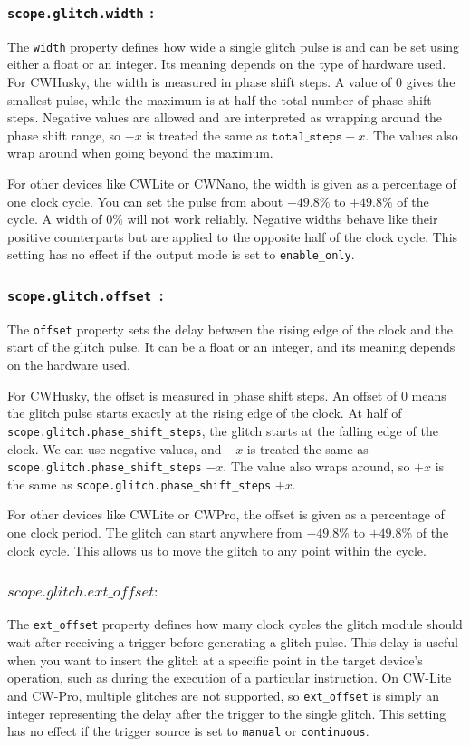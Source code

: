\subsubsection{\textbf{\texttt{scope.glitch.width} :}} 
The \texttt{width} property defines how wide a single glitch pulse is and can be set using either a float or an integer. Its meaning depends on the type of hardware used. For CWHusky, the width is measured in phase shift steps. A value of 0 gives the smallest pulse, while the maximum is at half the total number of phase shift steps. Negative values are allowed and are interpreted as wrapping around the phase shift range, so $-x$ is treated the same as $\texttt{total\_steps} - x$. The values also wrap around when going beyond the maximum.

For other devices like CWLite or CWNano, the width is given as a percentage of one clock cycle. You can set the pulse from about $-49.8\%$ to $+49.8\%$ of the cycle. A width of $0\%$ will not work reliably. Negative widths behave like their positive counterparts but are applied to the opposite half of the clock cycle. This setting has no effect if the output mode is set to \texttt{enable\_only}.

\subsubsection{\textbf{\texttt{scope.glitch.offset }:}}
The \texttt{offset} property sets the delay between the rising edge of the clock and the start of the glitch pulse. It can be a float or an integer, and its meaning depends on the hardware used.

For CWHusky, the offset is measured in phase shift steps. An offset of 0 means the glitch pulse starts exactly at the rising edge of the clock. At half of \texttt{scope.glitch.phase\_shift\_steps}, the glitch starts at the falling edge of the clock. We can use negative values, and $-x$ is treated the same as \texttt{scope.glitch.phase\_shift\_steps} $- x$. The value also wraps around, so $+x$ is the same as \texttt{scope.glitch.phase\_shift\_steps} $+ x$. 

For other devices like CWLite or CWPro, the offset is given as a percentage of one clock period. The glitch can start anywhere from $-49.8\%$ to $+49.8\%$ of the clock cycle. This allows us to move the glitch to any point within the cycle.

\subsubsection{$scope.glitch.ext\_offset :$}
The \texttt{ext\_offset} property defines how many clock cycles the glitch module should wait after receiving a trigger before generating a glitch pulse. This delay is useful when you want to insert the glitch at a specific point in the target device’s operation, such as during the execution of a particular instruction. On CW-Lite and CW-Pro, multiple glitches are not supported, so \texttt{ext\_offset} is simply an integer representing the delay after the trigger to the single glitch. This setting has no effect if the trigger source is set to \texttt{manual} or \texttt{continuous}.

